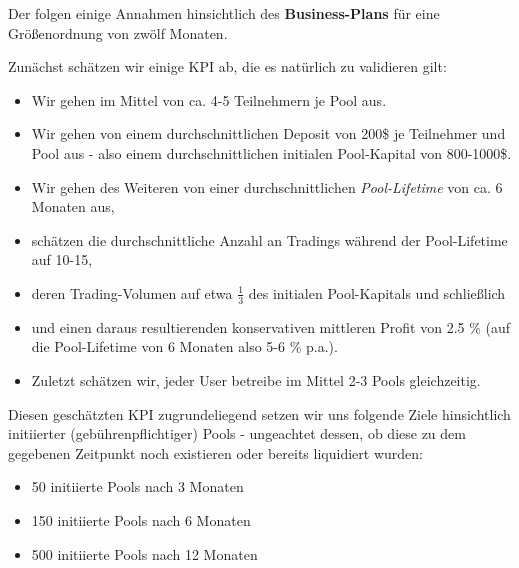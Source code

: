 \vspace{0.6cm}

Der  folgen einige Annahmen hinsichtlich des \textbf{Business-Plans} für eine Größenordnung von zwölf Monaten.

\vspace{0.3cm}

\begin{Assumption}\label{bp}

\vspace{0.75cm}


\vspace{0.75cm}

Zunächst schätzen wir einige KPI ab, die es natürlich zu validieren gilt:

\begin{itemize}
	\item Wir gehen im Mittel von ca. 4-5 Teilnehmern je Pool aus.
	\item Wir gehen von einem durchschnittlichen Deposit von 200\$ je Teilnehmer und Pool aus - also einem durchschnittlichen initialen Pool-Kapital von 800-1000\$.
	\item Wir gehen des Weiteren von einer durchschnittlichen \textit{Pool-Lifetime} von ca. 6 Monaten aus,
	\item schätzen die durchschnittliche Anzahl an Tradings während der Pool-Lifetime auf 10-15,
	\item deren Trading-Volumen auf etwa $\frac{1}{3}$ des initialen Pool-Kapitals und schließlich 
	\item und einen daraus resultierenden konservativen mittleren Profit von 2.5 \% (auf die Pool-Lifetime von 6 Monaten also 5-6 \% p.a.).
	\item Zuletzt schätzen wir, jeder User betreibe im Mittel 2-3 Pools gleichzeitig.
\end{itemize}

\vspace{0.5cm}

Diesen geschätzten KPI zugrundeliegend setzen wir uns folgende Ziele hinsichtlich initiierter (gebührenpflichtiger) Pools - ungeachtet dessen, ob diese zu dem gegebenen Zeitpunkt noch existieren oder bereits liquidiert wurden:

\begin{itemize}
	\item 50 initiierte Pools nach 3 Monaten
	\item 150 initiierte Pools nach 6 Monaten
	\item 500 initiierte Pools nach 12 Monaten
\end{itemize}

\end{Assumption}

